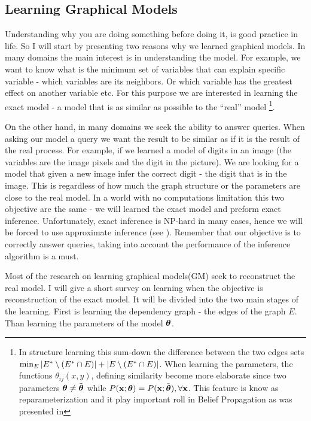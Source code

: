 \subsection{Learning Graphical Models}
\label{sec:learning}
Understanding why you are doing something before doing it, is good practice in life. 
So I will start by presenting two reasons why we learned graphical models.
In many domains the main interest is in understanding the model.
For example, we want to know what is the minimum set of variables that can explain specific variable - which variables are its neighbors.
Or which variable has the greatest effect on another variable etc.
For this purpose we are interested in learning the exact model - a model that is as similar as possible to the ``real'' model \footnote{
In structure learning this sum-down the difference between the two edges sets $ \min_{E} |{E}^{*}\setminus ({E}^{*} \cap E)| + |E \setminus ({E}^{*} \cap E)|$.
When learning the parameters, the functions $\theta_{ij}(x,y)$, defining similarity become more elaborate since two parameters $\boldsymbol{\theta} \neq \tilde{\boldsymbol{\theta}}$ while $P({\bf x}; \boldsymbol{\theta}) = P({\bf x}; \tilde{\boldsymbol{\theta}}), \forall {\bf x}$.
This feature is know as reparameterization and it play important roll in Belief Propagation as was presented in }.

On the other hand, in many domains we seek the ability to answer queries.
When asking our model a query we want the result to be similar as if it is the result of the real process.
For example, if we learned a model of digits in an image (the variables are the image pixels and the digit in the picture).
We are looking for a model that given a new image infer the correct digit - the digit that is in the image.
This is regardless of how much the graph structure or the parameters are close to the real model.
In a world with no computations limitation this two objective are the same - we will learned the exact model and preform exact inference.
Unfortunately, exact inference is NP-hard in many cases, hence we will be forced to use approximate inference (see ).
Remember that our objective is to correctly answer queries, taking into account the performance of the inference algorithm is a must.

Most of the research on learning graphical models(GM) seek to reconstruct the real model.
I will give a short survey on learning when the objective is reconstruction of the exact model.
It will be divided into the two main stages of the learning.
First is learning the dependency graph - the edges of the graph $E$.
Than learning the parameters of the model $\boldsymbol{\theta}$.
